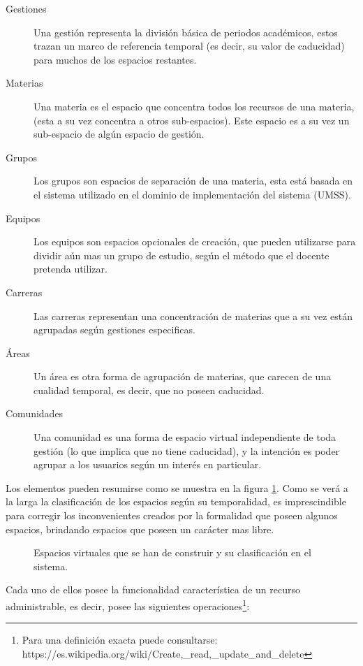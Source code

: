 \begin{description}
\item [Gestiones] Una gestión representa la división básica de periodos
académicos, estos trazan un marco de referencia temporal (es decir, su valor de
caducidad) para muchos de los espacios restantes.
\item [Materias] Una materia es el espacio que concentra todos los recursos de
una materia, (esta a su vez concentra a otros sub-espacios). Este espacio es a
su vez un sub-espacio de algún espacio de gestión.
\item [Grupos] Los grupos son espacios de separación de una materia, esta está
basada en el sistema utilizado en el dominio de implementación del sistema
(UMSS).
\item [Equipos] Los equipos son espacios opcionales de creación, que pueden
utilizarse para dividir aún mas un grupo de estudio, según el método que el
docente pretenda utilizar.
\item [Carreras] Las carreras representan una concentración de materias que a su
vez están agrupadas según gestiones especificas.
\item [Áreas] Un área es otra forma de agrupación de materias, que carecen de
una cualidad temporal, es decir, que no poseen caducidad.
\item [Comunidades] Una comunidad es una forma de espacio virtual independiente
de toda gestión (lo que implica que no tiene caducidad), y la intención es poder
agrupar a los usuarios según un interés en particular.
\end{description}

Los elementos pueden resumirse como se muestra en la figura \ref{espacios}.
Como se verá a la larga la clasificación de los espacios según su temporalidad,
es imprescindible para corregir los inconvenientes creados por la formalidad que
poseen algunos espacios, brindando espacios que poseen un carácter mas libre.

\begin{figure}
\centering

\caption{Espacios virtuales que se han de construir y su clasificación en el
sistema.}
\label{espacios}
\end{figure}

Cada uno de ellos posee la funcionalidad característica de un recurso
administrable, es decir, posee las siguientes operaciones\footnote{Para una
definición exacta puede consultarse:
https://es.wikipedia.org/wiki/Create,\_read,\_update\_and\_delete}:

